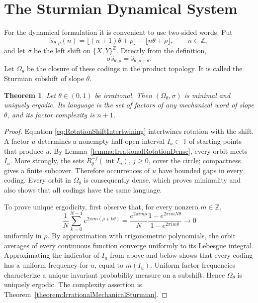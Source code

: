 \documentclass{book}
\newtheorem{theorem}[definition]{Theorem}
\begin{document}
\section{The Sturmian Dynamical System}

For the dynamical formulation it is convenient to use two-sided words.  Put
\[
  \widehat{s}_{\theta,\rho}(n)
  =\lfloor(n+1)\theta+\rho\rfloor
   -\lfloor n\theta+\rho\rfloor,
  \qquad n\in\mathbb Z,
\]
and let \(\sigma\) be the left shift on \(\{X,Y\}^{\mathbb Z}\).  Directly
from the definition,
\begin{equation}\label{eq:RotationShiftIntertwining}
  \sigma\widehat{s}_{\theta,\rho}
  =\widehat{s}_{\theta,\rho+\theta}.
\end{equation}
Let \(\Omega_\theta\) be the closure of these codings in the product
topology.  It is called the \textnormal{Sturmian subshift} of slope
\(\theta\).

\begin{theorem}\label{theorem:SturmianDynamicalSystem}
  Let \(\theta\in(0,1)\) be irrational.  Then
  \((\Omega_\theta,\sigma)\) is minimal and uniquely ergodic.  Its language
  is the set of factors of any mechanical word of slope \(\theta\), and its
  factor complexity is \(n+1\).
\end{theorem}
\begin{proof}
  Equation \eqref{eq:RotationShiftIntertwining} intertwines rotation with
  the shift.  A factor \(u\) determines a nonempty half-open interval
  \(I_u\subset\mathbb T\) of starting points that produce \(u\).  By
  Lemma~\ref{lemma:IrrationalRotationDense}, every orbit meets \(I_u\).
  More strongly, the sets \(R_\theta^{-j}(\operatorname{int}I_u)\),
  \(j\geq0\), cover the circle; compactness gives a finite subcover.
  Therefore occurrences of \(u\) have bounded gaps in every coding.  Every
  orbit in \(\Omega_\theta\) is consequently dense, which proves
  minimality and also shows that all codings have the same language.

  To prove unique ergodicity, first observe that, for every nonzero
  \(m\in\mathbb Z\),
  \[
    \frac1N\sum_{k=0}^{N-1}e^{2\pi im(\rho+k\theta)}
    =\frac{e^{2\pi im\rho}}{N}
      \frac{1-e^{2\pi imN\theta}}{1-e^{2\pi im\theta}}
    \longrightarrow0
  \]
  uniformly in \(\rho\).  By approximation with trigonometric polynomials,
  the orbit averages of every continuous function converge uniformly to
  its Lebesgue integral.  Approximating the indicator of \(I_u\) from
  above and below shows that every coding has a uniform frequency for
  \(u\), equal to \(m(I_u)\).  Uniform factor frequencies characterize a
  unique invariant probability measure on a subshift.  Hence
  \(\Omega_\theta\) is uniquely ergodic.  The complexity assertion is
  Theorem~\ref{theorem:IrrationalMechanicalSturmian}.
\end{proof}
\end{document}
